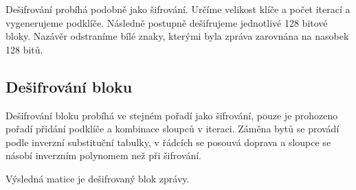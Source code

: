 Dešifrování probíhá podobně jako šifrování. Určíme velikost klíče a počet iterací a vygenerujeme podklíče. Následně postupně dešifrujeme jednotlivé 128 bitové bloky. Nazávěr odstraníme bílé znaky, kterými byla zpráva zarovnána na nasobek 128 bitů.

\subsection{Dešifrování bloku}

Dešifrování bloku probíhá ve stejném pořadí jako šifrování, pouze je prohozeno pořadí přidání podklíče a kombinace sloupců v iteraci. Záměna bytů se provádí podle inverzní substituční tabulky, v řádcích se posouvá doprava a sloupce se násobí inverzním polynomem než při šifrování.

Výsledná matice je dešifrovaný blok zprávy.

